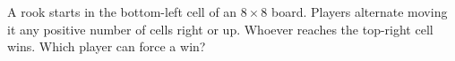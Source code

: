A rook starts in the bottom-left cell of an $8\times8$ board. Players alternate moving it any positive number of cells right or up. Whoever reaches the top-right cell wins. Which player can force a win?
